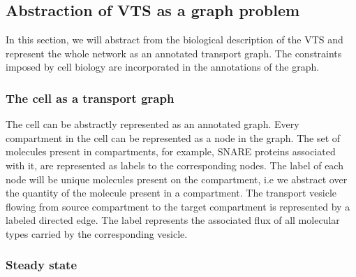 \subsection{Abstraction of VTS as a graph problem}


\noindent In this section, we will abstract from the biological description of the VTS and represent the whole network as an annotated transport graph. 
%
The constraints imposed by cell biology are incorporated in the annotations of the graph. 

\subsubsection{The cell as a transport graph} 
The cell can be abstractly represented as an annotated graph. 
Every compartment in the cell can be represented as a node in the graph. 
%
The set of molecules present in compartments, for example, SNARE proteins associated with it, are represented as labels to the corresponding nodes.
%
The label of each node will be unique molecules present on the compartment, i.e we abstract over the quantity of the molecule present in a compartment.
%
The transport vesicle flowing from source compartment to the target compartment is represented by a labeled directed edge. 
% 
The label represents the associated flux of all molecular types carried by the corresponding vesicle.
%
%

\subsubsection{Steady state} 
%
%

